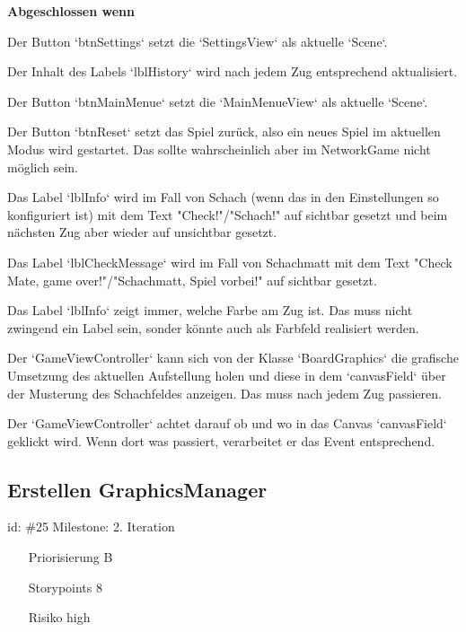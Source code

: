 \textbf{Abgeschlossen wenn}
\begin{todolist}
    \item[\done]  Der Button `btnSettings` setzt die `SettingsView` als aktuelle `Scene`.
  \item[\done]  Der Inhalt des Labels `lblHistory` wird nach jedem Zug entsprechend aktualisiert.
  \item[\done]  Der Button `btnMainMenue` setzt die `MainMenueView` als aktuelle `Scene`.
  \item[\done]  Der Button `btnReset` setzt das Spiel zurück, also ein neues Spiel im aktuellen Modus wird gestartet. Das sollte wahrscheinlich aber im NetworkGame nicht möglich sein.
  \item[\done]  Das Label `lblInfo` wird im Fall von Schach (wenn das in den Einstellungen so konfiguriert ist) mit dem Text "Check!"/"Schach!" auf sichtbar gesetzt und beim nächsten Zug aber wieder auf unsichtbar gesetzt.
  \item[\done]  Das Label `lblCheckMessage` wird im Fall von Schachmatt mit dem Text "Check Mate, game over!"/"Schachmatt, Spiel vorbei!" auf sichtbar gesetzt.
  \item[\done]  Das Label `lblInfo` zeigt immer, welche Farbe am Zug ist. Das muss nicht zwingend ein Label sein, sonder könnte auch als Farbfeld realisiert werden.
  \item[\done]  Der `GameViewController` kann sich von der Klasse `BoardGraphics` die grafische Umsetzung des aktuellen Aufstellung holen und diese in dem `canvasField` über der Musterung des Schachfeldes anzeigen. Das muss nach jedem Zug passieren.
  \item[\done]  Der `GameViewController` achtet darauf ob und wo in das Canvas `canvasField` geklickt wird. Wenn dort was passiert, verarbeitet er das Event entsprechend.

\end{todolist}


\subsection*{Erstellen GraphicsManager}
id: \#25 Milestone: 2. Iteration\\

\begin{itemize}
\item[Priorisierung] B
\item[Storypoints] 8
\item[Risiko] high
\end{itemize}

